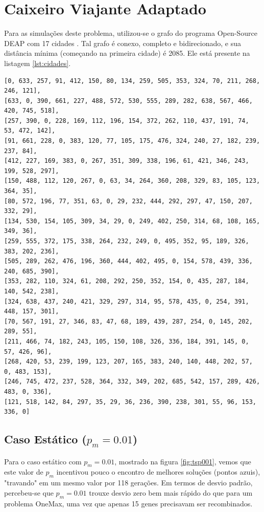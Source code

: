 \section{Caixeiro Viajante Adaptado}

Para as simulações deste problema, utilizou-se o grafo do programa Open-Source DEAP com 17 cidades \cite{DEAP_JMLR2012, deap2016tsp}. Tal grafo é conexo, completo e bidirecionado, e sua distância mínima (começando na primeira cidade) é 2085. Ele está presente na listagem \ref{lst:cidades}.

\begin{lstlisting}[float, floatplacement=H, caption={Mapa de cidades para o problema do Caixeiro Viajante Adaptado.}, label=lst:cidades]
[0, 633, 257, 91, 412, 150, 80, 134, 259, 505, 353, 324, 70, 211, 268, 246, 121],
[633, 0, 390, 661, 227, 488, 572, 530, 555, 289, 282, 638, 567, 466, 420, 745, 518],
[257, 390, 0, 228, 169, 112, 196, 154, 372, 262, 110, 437, 191, 74, 53, 472, 142],
[91, 661, 228, 0, 383, 120, 77, 105, 175, 476, 324, 240, 27, 182, 239, 237, 84],
[412, 227, 169, 383, 0, 267, 351, 309, 338, 196, 61, 421, 346, 243, 199, 528, 297],
[150, 488, 112, 120, 267, 0, 63, 34, 264, 360, 208, 329, 83, 105, 123, 364, 35],
[80, 572, 196, 77, 351, 63, 0, 29, 232, 444, 292, 297, 47, 150, 207, 332, 29],
[134, 530, 154, 105, 309, 34, 29, 0, 249, 402, 250, 314, 68, 108, 165, 349, 36],
[259, 555, 372, 175, 338, 264, 232, 249, 0, 495, 352, 95, 189, 326, 383, 202, 236],
[505, 289, 262, 476, 196, 360, 444, 402, 495, 0, 154, 578, 439, 336, 240, 685, 390],
[353, 282, 110, 324, 61, 208, 292, 250, 352, 154, 0, 435, 287, 184, 140, 542, 238],
[324, 638, 437, 240, 421, 329, 297, 314, 95, 578, 435, 0, 254, 391, 448, 157, 301],
[70, 567, 191, 27, 346, 83, 47, 68, 189, 439, 287, 254, 0, 145, 202, 289, 55],
[211, 466, 74, 182, 243, 105, 150, 108, 326, 336, 184, 391, 145, 0, 57, 426, 96],
[268, 420, 53, 239, 199, 123, 207, 165, 383, 240, 140, 448, 202, 57, 0, 483, 153],
[246, 745, 472, 237, 528, 364, 332, 349, 202, 685, 542, 157, 289, 426, 483, 0, 336],
[121, 518, 142, 84, 297, 35, 29, 36, 236, 390, 238, 301, 55, 96, 153, 336, 0]
\end{lstlisting}

\subsection{Caso Estático ($p_m = 0.01$)}

Para o caso estático com $p_m = 0.01$, mostrado na figura \ref{fig:tsp001}, vemos que este valor de $p_m$ incentivou pouco o encontro de melhores soluções (pontos azuis), "travando" em um mesmo valor por 118 gerações. Em termos de desvio padrão, percebeu-se que $p_m = 0.01$ trouxe desvio zero bem mais rápido do que para um problema OneMax, uma vez que apenas 15 genes precisavam ser recombinados.

